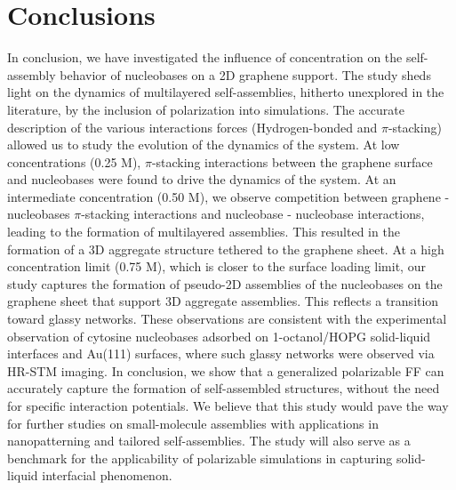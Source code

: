 \section{Conclusions}
In conclusion, we have investigated the influence of concentration on the self-assembly behavior of nucleobases on a 2D graphene support. The study sheds light on the dynamics of multilayered self-assemblies, hitherto unexplored in the literature, by the inclusion of polarization into simulations. The accurate description of the various interactions forces (Hydrogen-bonded and $\pi$-stacking) allowed us to study the evolution of the dynamics of the system.  At low concentrations (0.25 M), $\pi$-stacking interactions between the graphene surface and nucleobases were found to drive the dynamics of the system. At an intermediate concentration (0.50 M), we observe competition between graphene - nucleobases $\pi$-stacking interactions and nucleobase - nucleobase interactions, leading to the formation of multilayered assemblies. This resulted in the formation of a 3D aggregate structure tethered to the graphene sheet. At a high concentration limit (0.75 M), which is closer to the surface loading limit, our study captures the formation of pseudo-2D assemblies of the nucleobases on the graphene sheet that support 3D aggregate assemblies. This reflects a transition toward glassy networks. These observations are consistent with the experimental observation of cytosine nucleobases adsorbed on 1-octanol/HOPG solid-liquid interfaces and Au(111) surfaces,\supercite{kelly_understanding_2008, wandlowski_structure_1996, zhao_investigating_2016, xu_coadsorption_2006} where such glassy networks were observed via HR-STM imaging. In conclusion, we show that a generalized polarizable FF can accurately capture the formation of self-assembled structures, without the need for specific interaction potentials. We believe that this study would pave the way for further studies on small-molecule assemblies with applications in nanopatterning and tailored self-assemblies. The study will also serve as a benchmark for the applicability of polarizable simulations in capturing solid-liquid interfacial phenomenon.